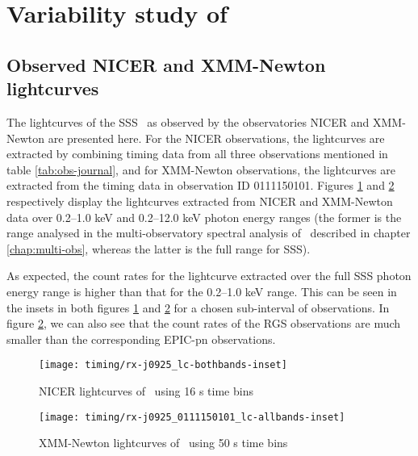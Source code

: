 	\newpage
	\section{Variability study of \source} \label{results:variability}
	
		\subsection{Observed NICER and XMM-Newton lightcurves}
			The lightcurves of the SSS \source\ as observed by the observatories NICER and XMM-Newton are presented here. For the NICER observations, the lightcurves are extracted by combining timing data from all three observations mentioned in table \ref{tab:obs-journal}, and for XMM-Newton observations, the lightcurves are extracted from the timing data in observation ID 0111150101. Figures \ref{result:lc-mrvel-nicer} and \ref{result:lc-mrvel-xmm} respectively display the lightcurves extracted from NICER and XMM-Newton data over 0.2--1.0 keV and 0.2--12.0 keV photon energy ranges (the former is the range analysed in the multi-observatory spectral analysis of \source\ described in chapter \ref{chap:multi-obs}, whereas the latter is the full range for SSS).
			
			As expected, the count rates for the lightcurve extracted over the full SSS photon energy range is higher than that for the 0.2--1.0 keV range. This can be seen in the insets in both figures \ref{result:lc-mrvel-nicer} and \ref{result:lc-mrvel-xmm} for a chosen sub-interval of observations. In figure \ref{result:lc-mrvel-xmm}, we can also see that the count rates of the RGS observations are much smaller than the corresponding EPIC-pn observations.
			
			\begin{figure}[h!]
				\centering
				\texttt{[image: timing/rx-j0925\_lc-bothbands-inset]}
				\caption{NICER lightcurves of \source\ using 16 s time bins}
				\label{result:lc-mrvel-nicer}
			\end{figure}
			
			
			\begin{figure}[h!]
				\centering
				\texttt{[image: timing/rx-j0925\_0111150101\_lc-allbands-inset]}
				\caption{XMM-Newton lightcurves of \source\ using 50 s time bins}
				\label{result:lc-mrvel-xmm}
			\end{figure}
			
